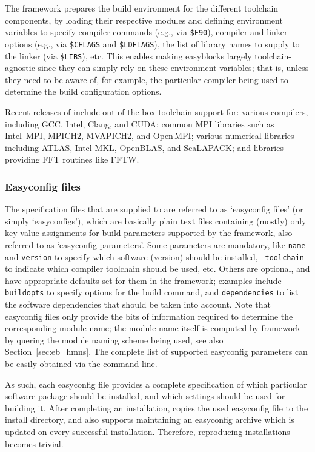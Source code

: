 The \easybuild{} framework prepares the build environment for the different
toolchain components, by loading their respective modules and defining environment
variables to specify compiler commands (e.g., via \texttt{\small \$F90}), compiler
and linker options (e.g., via \texttt{\small \$CFLAGS} and
\texttt{\small \$LDFLAGS}), the list of library names to supply to the linker (via
\texttt{\small \$LIBS}), etc. This enables
making easyblocks largely toolchain-agnostic since they can simply rely on these
environment variables; that is, unless they need to be aware of, for example, the
particular compiler being used to determine the build configuration options.

Recent releases of \easybuild{} include out-of-the-box toolchain support for: various
compilers, including GCC, Intel, Clang, and CUDA; common MPI libraries such as
Intel~MPI, MPICH2, MVAPICH2, and Open\,MPI; various numerical libraries including
ATLAS, Intel MKL, OpenBLAS, and ScaLAPACK; and libraries providing FFT routines
like FFTW.

\subsubsection{Easyconfig files}
\label{sec:eb_easyconfigs}

The specification files that are supplied to \easybuild{} are referred to as
`easyconfig files' (or simply `easyconfigs'), which are basically plain text
files containing (mostly) only key-value assignments for build parameters supported
by the framework, also referred to as `easyconfig parameters'. Some
parameters are mandatory, like \texttt{\small name} and \texttt{\small version} to
specify which software (version) should be installed, \texttt{\small
toolchain} to indicate which compiler toolchain should be used, etc. Others are
optional, and have appropriate defaults set for them in the \easybuild{} framework;
examples include \texttt{\small buildopts} to specify options for the build command, 
and \texttt{\small dependencies} to list the software dependencies that should be
taken into account. Note that easyconfig files only provide the bits of information required
to determine the corresponding module name; the module name itself is computed
by \easybuild{} framework by quering the module naming scheme being used, see also
Section~\ref{sec:eb_hmns}. The complete list of supported easyconfig parameters can
be easily obtained via the \easybuild{} command line.

As such, each easyconfig file provides a complete specification of which particular
software package should be installed, and which settings should be used for building
it. After completing an installation, \easybuild{} copies the used easyconfig file
to the install directory, and also supports maintaining an easyconfig archive which
is updated on every successful installation. Therefore, reproducing installations
becomes trivial.


